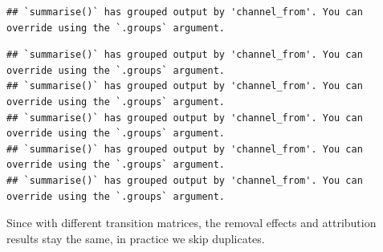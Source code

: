 \documentclass[
]{book}
\newenvironment{Shaded}{\begin{snugshade}}{\end{snugshade}}
\newcommand{\AttributeTok}[1]{\textcolor[rgb]{0.77,0.63,0.00}{#1}}
\newcommand{\CommentTok}[1]{\textcolor[rgb]{0.56,0.35,0.01}{\textit{#1}}}
\newcommand{\FunctionTok}[1]{\textcolor[rgb]{0.00,0.00,0.00}{#1}}
\newcommand{\NormalTok}[1]{#1}
\newcommand{\OtherTok}[1]{\textcolor[rgb]{0.56,0.35,0.01}{#1}}
\newcommand{\SpecialCharTok}[1]{\textcolor[rgb]{0.00,0.00,0.00}{#1}}
\newcommand{\StringTok}[1]{\textcolor[rgb]{0.31,0.60,0.02}{#1}}
\begin{document}
\begin{verbatim}
## `summarise()` has grouped output by 'channel_from'. You can override using the `.groups` argument.
\end{verbatim}

\begin{verbatim}
## `summarise()` has grouped output by 'channel_from'. You can override using the `.groups` argument.
## `summarise()` has grouped output by 'channel_from'. You can override using the `.groups` argument.
## `summarise()` has grouped output by 'channel_from'. You can override using the `.groups` argument.
## `summarise()` has grouped output by 'channel_from'. You can override using the `.groups` argument.
## `summarise()` has grouped output by 'channel_from'. You can override using the `.groups` argument.
\end{verbatim}

\begin{Shaded}
\end{Shaded}

Since with different transition matrices, the removal effects and attribution results stay the same, in practice we skip duplicates.
\end{document}
